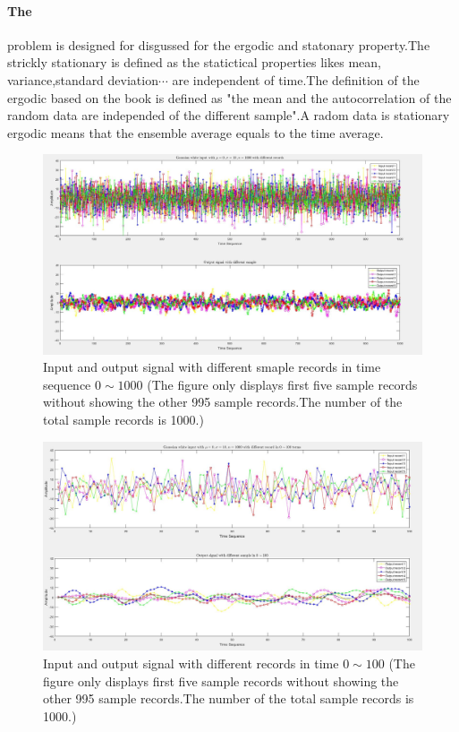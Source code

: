 \documentclass[12pt,a4paper]{article}
\begin{document}
				\paragraph{The}problem is designed for disgussed for the ergodic and statonary property.The strickly stationary is defined as the statictical properties likes mean,\\variance,standard deviation$\cdots$ are independent of time.The definition of the ergodic based on the book\cite{Book1} is defined as "the mean and the autocorrelation of the random data are independed of the different sample".A radom data is stationary ergodic means that the ensemble average equals to the time average. 
			\begin{figure}[H]
				\centering
				\includegraphics[scale=0.4]{Problem3a}
				\caption[Input and output signal with different records]{Input and output signal with different smaple records in time sequence $0\sim1000$ (The figure only displays first five sample records without showing the other 995 sample records.The number of the total sample records is 1000.)} 
			\end{figure}
			\begin{figure}[H]
				\centering
				\includegraphics[scale=0.4]{Problem3b}
				\caption[Input and output signal with different records in time $0\sim100$]{Input and output signal with different records in time $0\sim100$ (The figure only displays first five sample records without showing the other 995 sample records.The number of the total sample records is 1000.)}
			\end{figure}
\end{document}
